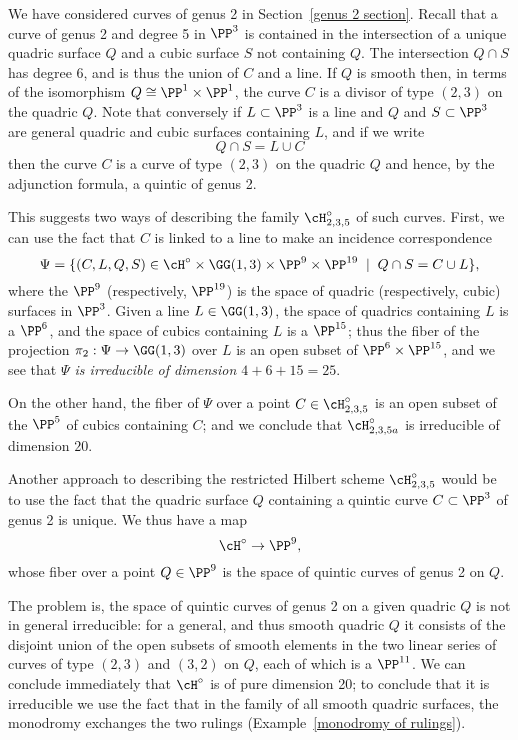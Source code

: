 We have considered curves of genus 2 in Section~\ref{genus 2 section}.  Recall that a curve of genus 2 and degree 5 in 
$\PP^3$ is contained in the intersection of a unique quadric surface $Q$ and a cubic surface $S$ not containing $Q$.
The intersection $Q\cap S$
has degree 6, and is thus the union of $C$ and a line. If $Q$ is smooth then, in terms of the isomorphism $Q \cong \PP^1 \times \PP^1$, the curve $C$ is a divisor of type $(2,3)$ on the quadric $Q$. Note that conversely if $L \subset \PP^3$ is a line and $Q$ and $S \subset \PP^3$ are general quadric and cubic surfaces containing $L$, and if we write
$$
Q \cap S = L \cup C
$$ 
then the curve $C$ is a curve of type $(2,3)$ on the quadric $Q$ and hence, by the adjunction formula,
 a quintic of genus 2.

This suggests two ways of describing the family $\cH^\circ_{2,3,5}$ of such curves. First, we can use the fact that $C$ is linked to a line to make an incidence correspondence
$$
\Psi = \{ (C, L, Q, S) \in \cH^\circ \times \GG(1,3) \times \PP^9 \times \PP^{19} \; \mid \; Q \cap S = C \cup L \},
$$
where the $\PP^9$ (respectively, $\PP^{19}$) is the space of quadric (respectively, cubic) surfaces in $\PP^3$. Given a line $L \in \GG(1,3)$, the space of quadrics containing $L$ is a $\PP^6$, and the space of cubics containing $L$ is a $\PP^{15}$; thus the fiber of the projection $\pi_2 : \Psi \to \GG(1,3)$ over $L$ is an open subset of $\PP^6 \times \PP^{15}$, and we see that \emph{$\Psi$ is irreducible of dimension $4 + 6 + 15 = 25$}.

On the other hand, the fiber of $\Psi$ over a point $C \in \cH^\circ_{2,3,5}$ is an open subset of the $\PP^5$ of cubics containing $C$; and we conclude that $\cH^\circ_{2,3,5a}$ is irreducible of dimension $20$.


Another approach to describing the restricted Hilbert scheme $\cH^\circ_{2,3,5}$ would be to use the fact that the quadric surface $Q$ containing a quintic curve $C \subset \PP^3$ of genus 2 is unique. We thus have a map
$$
\cH^\circ \to \PP^9,
$$
whose fiber over a point $Q \in \PP^9$ is the space of quintic curves of genus 2 on $Q$. 

The problem is, the space of quintic curves of genus 2 on a given quadric $Q$ is not in general irreducible: for a general, and thus smooth quadric $Q$ it consists of the disjoint union of the open subsets of smooth elements in the two linear series of curves of type $(2,3)$ and $(3,2)$ on $Q$, each of which is a $\PP^{11}$. We can conclude immediately that $\cH^\circ$ is of pure dimension 20; to conclude that it is irreducible we use the fact that in the family of all smooth quadric surfaces, the monodromy exchanges the two rulings (Example~\ref{monodromy of rulings}).

